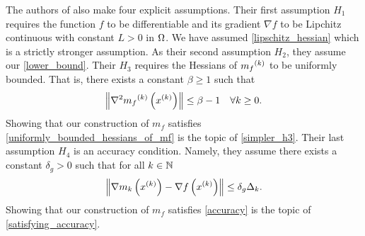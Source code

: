 The authors of \cite{Conejo:2013:GCT:2620806.2621814} also make four explicit assumptions.
Their first assumption $H_1$ requires the function $f$ to be differentiable and its gradient $\nabla f$ to be Lipchitz continuous with constant $L > 0$ in $\Omega$.
We have assumed \cref{lipschitz_hessian} which is a strictly stronger assumption.
As their second assumption $H_2$, they assume our \cref{lower_bound}.
Their $H_3$ requires the Hessians of ${{m}_f}^{(k)}$ to be uniformly bounded.
That is, there exists a constant $\beta \ge 1$ such that
\begin{align}
\label{uniformly_bounded_hessians_of_mf}
\left\|\nabla^2 {{m}_f}^{(k)}\left(x^{(k)}\right)\right\| \le \beta - 1\quad \forall k \ge 0.
\end{align}
Showing that our construction of $m_f$ satisfies \cref{uniformly_bounded_hessians_of_mf} is the topic of \cref{simpler_h3}.
Their last assumption $H_4$ is an accuracy condition.
Namely, they assume there exists a constant $\delta_g>0$ such that for all $k \in \mathbb N$
\begin{align}
\label{accuracy}
\left\|\nabla m_k\left(x^{(k)}\right) - \nabla f\left(x^{(k)}\right)\right\| \le \delta_g \Delta_k.
\end{align}
Showing that our construction of $m_f$ satisfies \cref{accuracy} is the topic of \cref{satisfying_accuracy}.


%

%
% 
% 

